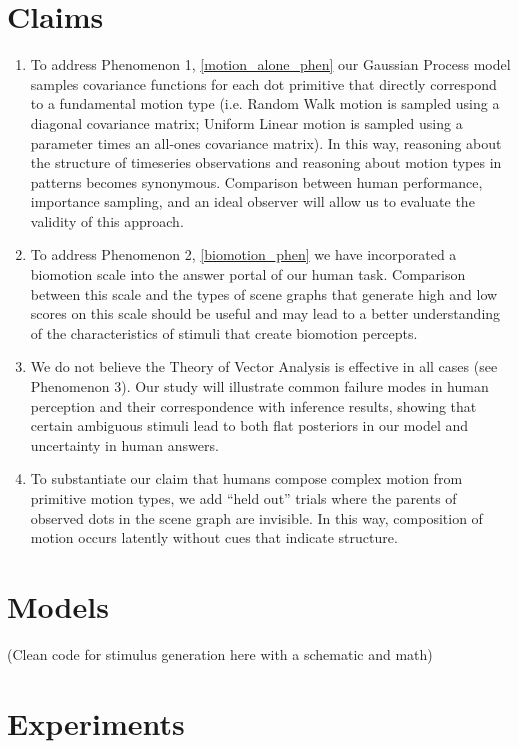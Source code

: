 \documentclass{scrartcl}
\begin{document}
\section{Claims}

\begin{enumerate}
  \item To address Phenomenon 1, \ref{motion_alone_phen} our Gaussian Process model samples covariance functions for each dot primitive that directly correspond to a fundamental motion type (i.e. Random Walk motion is sampled using a diagonal covariance matrix; Uniform Linear motion is sampled using a parameter times an all-ones covariance matrix). In this way, reasoning about the structure of timeseries observations and reasoning about motion types in patterns becomes synonymous. Comparison between human performance, importance sampling, and an ideal observer will allow us to evaluate the validity of this approach. 

  \item To address Phenomenon 2, \ref{biomotion_phen} we have incorporated a biomotion scale into the answer portal of our human task. Comparison between this scale and the types of scene graphs that generate high and low scores on this scale should be useful and may lead to a better understanding of the characteristics of stimuli that create biomotion percepts. 
  
  \item We do not believe the Theory of Vector Analysis is effective in all cases (see Phenomenon 3). Our study will illustrate common failure modes in human perception and their correspondence with inference results, showing that certain ambiguous stimuli lead to both flat posteriors in our model and uncertainty in human answers.

  \item To substantiate our claim that humans compose complex motion from primitive motion types, we add ``held out'' trials where the parents of observed dots in the scene graph are invisible. In this way, composition of motion occurs latently without cues that indicate structure. 

\end{enumerate}


\section{Models}
(Clean code for stimulus generation here with a schematic and math)

\section{Experiments}
\end{document}
